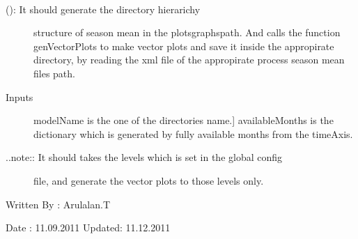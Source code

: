 \documentclass[letterpaper,10pt,english]{sphinxmanual}
\begin{document}
\begin{fulllineitems}
\label{diagnosis:generate_winds_plots.genSeasonMeanDirs}~\begin{description}
\item[{{\hyperref[diagnosis:generate_winds_plots.genSeasonMeanDirs]{}} (): It should generate the directory hierarichy}] \leavevmode
structure of season mean in the plotsgraphspath. And calls the
function genVectorPlots to make vector plots and save it inside the
appropirate directory, by reading the xml file of the appropirate
process season mean files path.

\item[{Inputs}] \leavevmode{[}modelName is the one of the directories name.{]}
availableMonths is the dictionary which is generated by fully
available months from the timeAxis.

\item[{..note:: It should takes the levels which is set in the global config}] \leavevmode
file, and generate the vector plots to those levels only.

\end{description}

Written By : Arulalan.T

Date : 11.09.2011
Updated: 11.12.2011

\end{fulllineitems}

\end{document}
